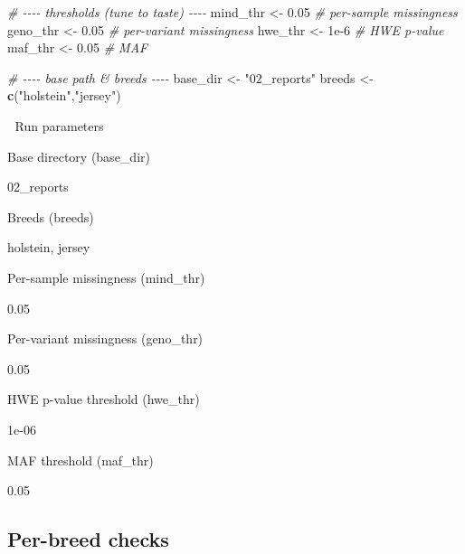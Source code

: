 \documentclass[
]{article}
\newenvironment{Shaded}{\begin{snugshade}}{\end{snugshade}}
\newcommand{\CommentTok}[1]{\textcolor[rgb]{0.56,0.35,0.01}{\textit{#1}}}
\newcommand{\FloatTok}[1]{\textcolor[rgb]{0.00,0.00,0.81}{#1}}
\newcommand{\FunctionTok}[1]{\textcolor[rgb]{0.13,0.29,0.53}{\textbf{#1}}}
\newcommand{\NormalTok}[1]{#1}
\newcommand{\OtherTok}[1]{\textcolor[rgb]{0.56,0.35,0.01}{#1}}
\newcommand{\StringTok}[1]{\textcolor[rgb]{0.31,0.60,0.02}{#1}}
\begin{document}
\begin{Shaded}
\begin{Highlighting}[]
\CommentTok{\# {-}{-}{-}{-} thresholds (tune to taste) {-}{-}{-}{-}}
\NormalTok{mind\_thr }\OtherTok{\textless{}{-}} \FloatTok{0.05}  \CommentTok{\# per{-}sample missingness}
\NormalTok{geno\_thr }\OtherTok{\textless{}{-}} \FloatTok{0.05}  \CommentTok{\# per{-}variant missingness}
\NormalTok{hwe\_thr  }\OtherTok{\textless{}{-}} \FloatTok{1e{-}6}  \CommentTok{\# HWE p{-}value}
\NormalTok{maf\_thr  }\OtherTok{\textless{}{-}} \FloatTok{0.05}  \CommentTok{\# MAF}

\CommentTok{\# {-}{-}{-}{-} base path \& breeds {-}{-}{-}{-}}
\NormalTok{base\_dir }\OtherTok{\textless{}{-}} \StringTok{"02\_reports"}
\NormalTok{breeds   }\OtherTok{\textless{}{-}} \FunctionTok{c}\NormalTok{(}\StringTok{"holstein"}\NormalTok{,}\StringTok{"jersey"}\NormalTok{)}
\end{Highlighting}
\end{Shaded}

🔧 Run parameters

Base directory (base\_dir)

02\_reports

Breeds (breeds)

holstein, jersey

Per-sample missingness (mind\_thr)

0.05

Per-variant missingness (geno\_thr)

0.05

HWE p-value threshold (hwe\_thr)

1e-06

MAF threshold (maf\_thr)

0.05

\subsection{Per-breed checks}\label{per-breed-checks}
\end{document}
